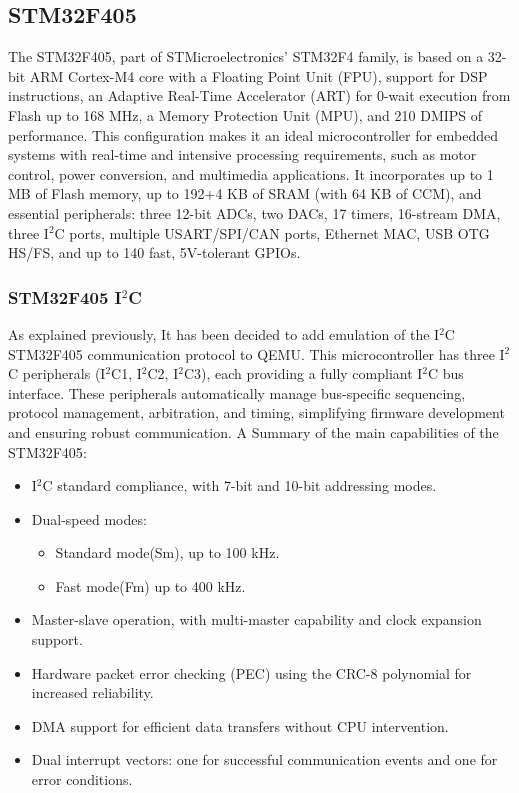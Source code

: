 \subsection{STM32F405}
\label{chap:analysis_stm32f05}


The STM32F405, part of STMicroelectronics' STM32F4 family, is based 
on a 32-bit ARM Cortex-M4 core with a Floating Point Unit (FPU), support for 
DSP instructions, an Adaptive Real-Time Accelerator (ART) for 0-wait execution 
from Flash up to 168 MHz, a Memory Protection Unit (MPU), and 210 DMIPS 
of performance. This configuration makes it an ideal microcontroller for embedded 
systems with real-time and intensive processing requirements, such as motor control, 
power conversion, and multimedia applications. It incorporates up to 1 MB of Flash 
memory, up to 192+4 KB of SRAM (with 64 KB of CCM), and essential peripherals: 
three 12-bit ADCs, two DACs, 17 timers, 16-stream DMA, three I$^2$C ports, multiple 
USART/SPI/CAN ports, Ethernet MAC, USB OTG HS/FS, and up to 140 fast, 
5V-tolerant GPIOs.

\subsubsection{STM32F405 I$^2$C}

As explained previously, It has been decided to add emulation of the I$^2$C \\
STM32F405 communication protocol to QEMU. This microcontroller has three I$^2$C 
peripherals (I$^2$C1, I$^2$C2, I$^2$C3), each providing a fully compliant I$^2$C bus interface. 
These peripherals automatically manage bus-specific sequencing, protocol 
management, arbitration, and timing, simplifying firmware development and ensuring 
robust communication. A Summary of the main capabilities of the STM32F405\cite{STM32F405Datasheet2026}:

\begin{itemize}
    \item I$^2$C standard compliance, with 7-bit and 10-bit addressing modes.
    \item Dual-speed modes: 
        \begin{itemize}
            \item Standard mode(Sm), up to 100 kHz.
            \item Fast mode(Fm) up to 400 kHz.
        \end{itemize}
    \item Master-slave operation, with multi-master capability and clock expansion support.
    \item Hardware packet error checking (PEC) using the CRC-8 polynomial for increased reliability.
    \item DMA support for efficient data transfers without CPU intervention. 
    \item Dual interrupt vectors: one for successful communication events and one for error conditions.
\end{itemize}

